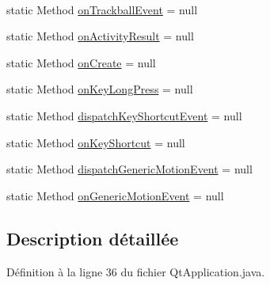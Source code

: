 \begin{DoxyCompactItemize}
$$\item 
static Method \hyperlink{classorg_1_1qtproject_1_1qt5_1_1android_1_1bindings_1_1_qt_application_aba0550a56d08380fb00cef9cc1a276d1}{on\-Trackball\-Event} = null
\item 
static Method \hyperlink{classorg_1_1qtproject_1_1qt5_1_1android_1_1bindings_1_1_qt_application_a6538f4bbf7fdf3a1eba5971bb830af71}{on\-Activity\-Result} = null
\item 
static Method \hyperlink{classorg_1_1qtproject_1_1qt5_1_1android_1_1bindings_1_1_qt_application_a2bd84d3f02531e21ab7434cd4d48b849}{on\-Create} = null
\item 
static Method \hyperlink{classorg_1_1qtproject_1_1qt5_1_1android_1_1bindings_1_1_qt_application_abe105cb7eb9d98af229bcc706ad7660b}{on\-Key\-Long\-Press} = null
\item 
static Method \hyperlink{classorg_1_1qtproject_1_1qt5_1_1android_1_1bindings_1_1_qt_application_aa2fb7f374d9a03d6b939375933ff5149}{dispatch\-Key\-Shortcut\-Event} = null
\item 
static Method \hyperlink{classorg_1_1qtproject_1_1qt5_1_1android_1_1bindings_1_1_qt_application_a1ce0a33219f8c6103b216ed433ceeefe}{on\-Key\-Shortcut} = null
\item 
static Method \hyperlink{classorg_1_1qtproject_1_1qt5_1_1android_1_1bindings_1_1_qt_application_a2c2d0ff311ded8aaa6dabdde99632a6c}{dispatch\-Generic\-Motion\-Event} = null
\item 
static Method \hyperlink{classorg_1_1qtproject_1_1qt5_1_1android_1_1bindings_1_1_qt_application_a2ba7755a97e7fadf952401719ca1f8e4}{on\-Generic\-Motion\-Event} = null
\end{DoxyCompactItemize}


\subsection{Description détaillée}


Définition à la ligne 36 du fichier Qt\-Application.\-java.



